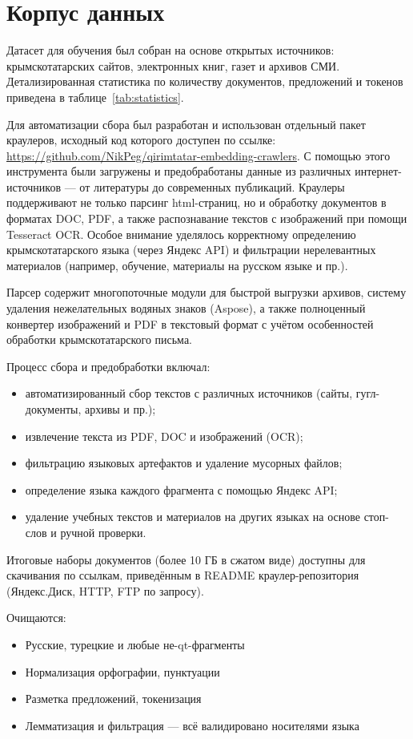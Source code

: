 \documentclass{article}
\begin{document}
\section{Корпус данных}

Датасет для обучения был собран на основе открытых источников: крымскотатарских сайтов, электронных книг, газет и архивов СМИ. Детализированная статистика по количеству документов, предложений и токенов приведена в таблице~\ref{tab:statistics}.

Для автоматизации сбора был разработан и использован отдельный пакет краулеров, исходный код которого доступен по ссылке: \url{https://github.com/NikPeg/qirimtatar-embedding-crawlers}. С помощью этого инструмента были загружены и предобработаны данные из различных интернет-источников — от литературы до современных публикаций. Краулеры поддерживают не только парсинг html-страниц, но и обработку документов в форматах DOC, PDF, а также распознавание текстов с изображений при помощи Tesseract OCR. Особое внимание уделялось корректному определению крымскотатарского языка (через Яндекс API) и фильтрации нерелевантных материалов (например, обучение, материалы на русском языке и пр.).

Парсер содержит многопоточные модули для быстрой выгрузки архивов, систему удаления нежелательных водяных знаков (Aspose), а также полноценный конвертер изображений и PDF в текстовый формат с учётом особенностей обработки крымскотатарского письма.

Процесс сбора и предобработки включал:
\begin{itemize}
    \item автоматизированный сбор текстов с различных источников (сайты, гугл-документы, архивы и пр.);
    \item извлечение текста из PDF, DOC и изображений (OCR);
    \item фильтрацию языковых артефактов и удаление мусорных файлов;
    \item определение языка каждого фрагмента с помощью Яндекс API;
    \item удаление учебных текстов и материалов на других языках на основе стоп-слов и ручной проверки.
\end{itemize}

Итоговые наборы документов (более 10 ГБ в сжатом виде) доступны для скачивания по ссылкам, приведённым в README краулер-репозитория (Яндекс.Диск, HTTP, FTP по запросу).

Очищаются:
\begin{itemize}
    \item Русские, турецкие и любые не-qt-фрагменты
    \item Нормализация орфографии, пунктуации
    \item Разметка предложений, токенизация
    \item Лемматизация и фильтрация — всё валидировано носителями языка
\end{itemize}
\end{document}
